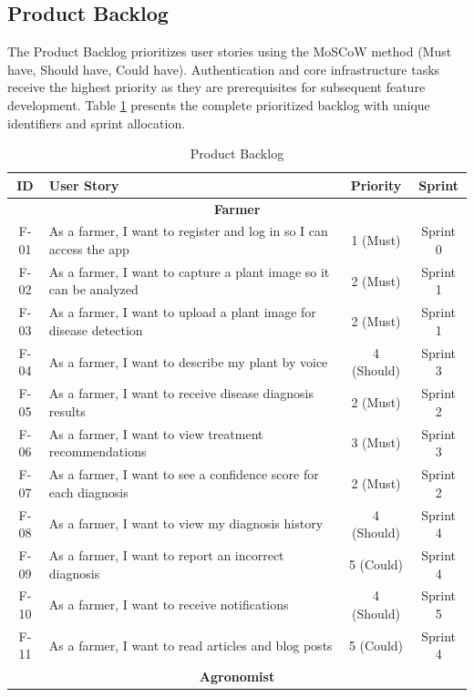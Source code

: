 \documentclass[12pt]{article}
\begin{document}
\subsection{Product Backlog}
The Product Backlog prioritizes user stories using the MoSCoW method (Must have, Should have, Could have). Authentication and core infrastructure tasks receive the highest priority as they are prerequisites for subsequent feature development. Table \ref{tab:product_backlog} presents the complete prioritized backlog with unique identifiers and sprint allocation.

\begin{table}[H]
\centering
\caption{Product Backlog}
\label{tab:product_backlog}
\small
\begin{tabular}{|c|p{11cm}|c|c|}
\hline
\textbf{ID} & \textbf{User Story} & \textbf{Priority} & \textbf{Sprint} \\
\hline
\multicolumn{4}{|c|}{\textbf{Farmer}} \\
\hline
F-01 & As a farmer, I want to register and log in so I can access the app & 1 (Must) & Sprint 0 \\
\hline
F-02 & As a farmer, I want to capture a plant image so it can be analyzed & 2 (Must) & Sprint 1 \\
\hline
F-03 & As a farmer, I want to upload a plant image for disease detection & 2 (Must) & Sprint 1 \\
\hline
F-04 & As a farmer, I want to describe my plant by voice & 4 (Should) & Sprint 3 \\
\hline
F-05 & As a farmer, I want to receive disease diagnosis results & 2 (Must) & Sprint 2 \\
\hline
F-06 & As a farmer, I want to view treatment recommendations & 3 (Must) & Sprint 3 \\
\hline
F-07 & As a farmer, I want to see a confidence score for each diagnosis & 2 (Must) & Sprint 2 \\
\hline
F-08 & As a farmer, I want to view my diagnosis history & 4 (Should) & Sprint 4 \\
\hline
F-09 & As a farmer, I want to report an incorrect diagnosis & 5 (Could) & Sprint 4 \\
\hline
F-10 & As a farmer, I want to receive notifications & 4 (Should) & Sprint 5 \\
\hline
F-11 & As a farmer, I want to read articles and blog posts & 5 (Could) & Sprint 4 \\
\hline
\multicolumn{4}{|c|}{\textbf{Agronomist}} \\

\end{tabular}
\end{table}
\end{document}
